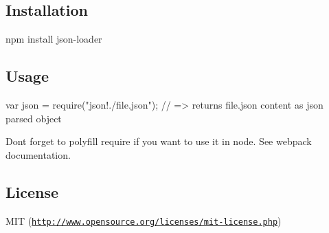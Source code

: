 \subsection*{Installation}

{\ttfamily npm install json-\/loader}

\subsection*{Usage}


\begin{DoxyCode}
var json = require("json!./file.json");
// => returns file.json content as json parsed object
\end{DoxyCode}


Don\textquotesingle{}t forget to polyfill {\ttfamily require} if you want to use it in node. See {\ttfamily webpack} documentation.

\subsection*{License}

M\+IT (\href{http://www.opensource.org/licenses/mit-license.php}{\tt http\+://www.\+opensource.\+org/licenses/mit-\/license.\+php}) 